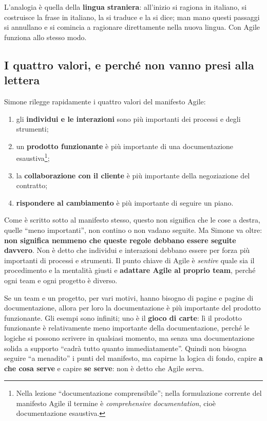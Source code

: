 L'analogia è quella della \textbf{lingua straniera}: all'inizio si ragiona in
italiano, si costruisce la frase in italiano, la si traduce e la si dice; man
mano questi passaggi si annullano e si comincia a ragionare direttamente
nella nuova lingua. Con Agile funziona allo stesso modo.

\subsection{I quattro valori, e perché non vanno presi alla lettera}

Simone rilegge rapidamente i quattro valori del manifesto Agile:
\begin{enumerate}
  \item gli \textbf{individui e le interazioni} sono più importanti dei
        processi e degli strumenti;
  \item un \textbf{prodotto funzionante} è più importante di una
        documentazione esaustiva\footnote{Nella lezione ``documentazione
        comprensibile''; nella formulazione corrente del manifesto Agile il
        termine è \emph{comprehensive documentation}, cioè documentazione
        esaustiva.};
  \item la \textbf{collaborazione con il cliente} è più importante della
        negoziazione del contratto;
  \item \textbf{rispondere al cambiamento} è più importante di seguire un
        piano.
\end{enumerate}
Come è scritto sotto al manifesto stesso, questo non significa che le cose a
destra, quelle ``meno importanti'', non contino o non vadano seguite. Ma
Simone va oltre: \textbf{non significa nemmeno che queste regole debbano
essere seguite davvero}. Non è detto che individui e interazioni debbano
essere per forza più importanti di processi e strumenti. Il punto chiave di
Agile è \emph{sentire} quale sia il procedimento e la mentalità giusti e
\textbf{adattare Agile al proprio team}, perché ogni team e ogni progetto è
diverso.

Se un team e un progetto, per vari motivi, hanno bisogno di pagine e pagine
di documentazione, allora per loro la documentazione è più importante del
prodotto funzionante. Gli esempi sono infiniti; uno è il \textbf{gioco di
carte}: lì il prodotto funzionante è relativamente meno importante della
documentazione, perché le logiche si possono scrivere in qualsiasi momento,
ma senza una documentazione solida a supporto ``cadrà tutto quanto
immediatamente''. Quindi non bisogna seguire ``a menadito'' i punti del
manifesto, ma capirne la logica di fondo, capire \textbf{a che cosa serve} e
capire \textbf{se serve}: non è detto che Agile serva.

